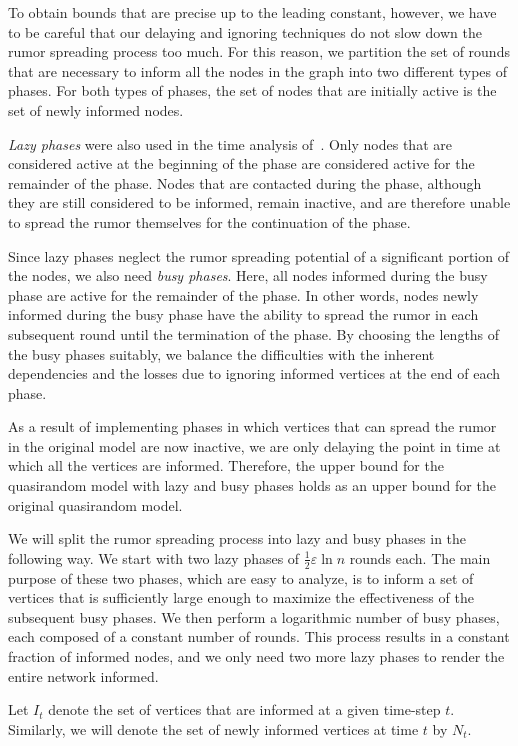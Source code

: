 \documentclass[12pt]{article}
\newcommand{\e}{\varepsilon}
\begin{document}
{To obtain bounds that are precise up to the leading constant, however, we have to be careful that our delaying and ignoring techniques do not slow down the rumor spreading process too much. For this reason, we partition the set of rounds that are necessary to inform all the nodes in the graph into two different types of phases. For both types of phases, the set of nodes that are initially active is the set of newly informed nodes.
	
\emph{Lazy phases} were also used in the time analysis of~\cite{DFS08}. Only nodes that are considered active at the beginning of the phase are considered active for the remainder of the phase.
Nodes that are contacted during the phase, although they are still considered to be informed, remain inactive, and are therefore unable to spread the rumor themselves for the continuation of the phase.

Since lazy phases neglect the rumor spreading potential of a significant portion of the nodes, we also need \emph{busy phases}. 
Here, all nodes informed during the busy phase are active for the remainder of the phase. 
In other words, nodes newly informed during the busy phase have the ability to spread the rumor in each subsequent round until the termination of the phase. By choosing the lengths of the busy phases suitably, we balance the difficulties with the inherent dependencies and the losses due to ignoring informed vertices at the end of each phase.
	
As a result of implementing phases in which vertices that can spread the rumor in the original model are now inactive, we are only delaying the point in time at which all the vertices are informed.
Therefore, the upper bound for the quasirandom model with lazy and busy phases holds as an upper bound for the original quasirandom model.

We will split the rumor spreading process into lazy and busy phases in the following way. We start with two lazy phases of $\frac{1}{2}\e\ln n$ rounds each. The main purpose of these two phases, which are easy to analyze, is to inform a set of vertices that is sufficiently large enough to maximize the effectiveness of the subsequent busy phases. We then perform a logarithmic number of busy phases, each composed of a constant number of rounds. This process results in a constant fraction of informed nodes, and we only need two more lazy phases to render the entire network informed.

Let $I_t$ denote the set of vertices that are informed at a given time-step $t$. Similarly, we will denote the set of newly informed vertices at time $t$ by $N_t$.

}
\end{document}
